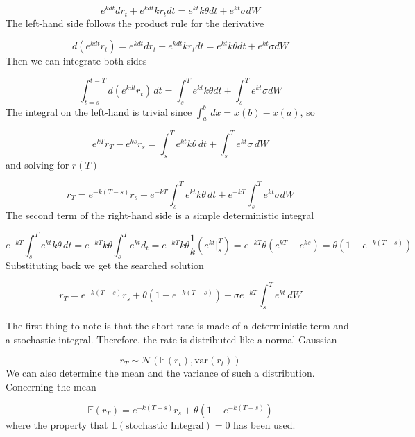 \begin{equation*}
e^{kdt}dr_t + e^{kdt}kr_t dt = e^{kt}k\theta dt + e^{kt}\sigma dW
\end{equation*}
The left-hand side follows the product rule for the derivative

\begin{equation*}
d(e^{kdt}r_t) = e^{kdt}dr_t + e^{kdt}kr_t dt= e^{kt}k\theta dt + e^{kt}\sigma dW
\end{equation*}
Then we can integrate both sides

\begin{equation*}
\int^{t=T}_{t=s} d(e^{kdt}r_t)\,dt = \int^T_s e^{kt}k\theta dt +\int^T_s e^{kt}\sigma dW
\end{equation*}
The integral on the left-hand is trivial since \(\int^b_a\,dx = x(b)-x(a)\), so

\begin{equation*}
e^{kT}r_T - e^{ks}r_s = \int^T_s e^{kt}k\theta\,dt +\int^T_s e^{kt}\sigma\,dW
\end{equation*}
and solving for $r(T)$

\begin{equation*}
r_T=e^{-k(T-s)}r_s+ e^{-kT}\int^T_s e^{kt}k\theta\,dt +e^{-kT}\int^T_s e^{kt}\sigma dW
\end{equation*}
The second term of the right-hand side is a simple deterministic integral

\begin{equation*}
e^{-kT}\int^T_s e^{kt}k\theta\,dt=e^{-kT}k\theta\int^T_s e^{kt}d_t=e^{-kT}k\theta\frac{1}{k}(e^{kt}|^T_s)= e^{-kT}\theta(e^{kT}-e^{ks})=\theta\left(1-e^{-k(T-s)}\right)
\end{equation*}
Substituting back we get the searched solution

\begin{equation}
r_T=e^{-k(T-s)} r_s+\theta(1-e^{-k(T-s)})+ \sigma e^{-kT}\int^T_s e^{kt}\,dW
\end{equation}

The first thing to note is that the short rate is made of a deterministic term
and a stochastic integral.
Therefore, the rate is distributed like a normal Gaussian

\begin{equation*}
r_T \sim \mathcal{N}(\mathbb{E}(r_t), \textrm{var}(r_t))
\end{equation*}
We can also determine the mean and the variance of such a distribution.
Concerning the mean

\begin{equation}
\mathbb{E}(r_T)=e^{-k(T-s)} r_s+\theta\left(1-e^{-k(T-s)}\right)
\end{equation}
where the property that $\mathbb{E}(\textrm{stochastic~Integral}) = 0$ has been used.

